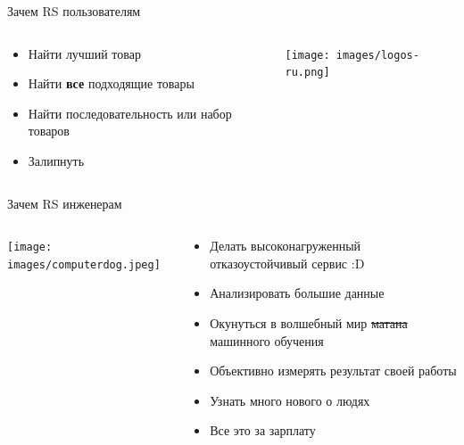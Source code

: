\documentclass[11pt,aspectratio=169,handout]{beamer}
\begin{document}
\begin{frame}{Зачем RS пользователям}

\begin{columns}

\begin{column}{0.45\textwidth}
   \begin{small}
    \begin{itemize}[<+->]
	\item Найти лучший товар
	\item Найти {\bf все} подходящие товары
	\item Найти последовательность или набор товаров
	\item Залипнуть
	\end{itemize}
    \end{small}
\end{column}

\begin{column}{0.45\textwidth}
   \begin{center}
		\texttt{[image: images/logos-ru.png]}
   \end{center}
\end{column}

\end{columns}

\end{frame}

\begin{frame}{Зачем RS инженерам}

\begin{columns}
\begin{column}{0.4\textwidth}
   \begin{center}
                \texttt{[image: images/computerdog.jpeg]}
   \end{center}
\end{column}
\begin{column}{0.5\textwidth}
    \begin{small}
    \begin{itemize}
    \item Делать высоконагруженный отказоустойчивый сервис :D
    \item Анализировать большие данные
    \item Окунуться в волшебный мир \sout{матана} машинного обучения
    \item Объективно измерять результат своей работы 
    \item Узнать много нового о людях
    \item Все это за зарплату
    \end{itemize}
    \end{small}
\end{column}
\end{columns}

\end{frame}
\end{document}
